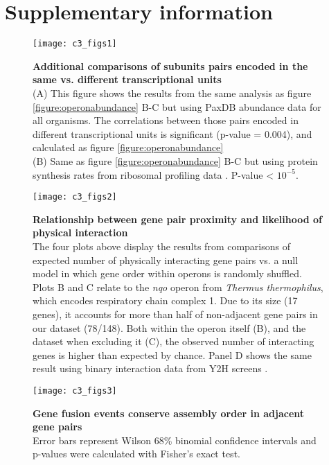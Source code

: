 \documentclass[a4paper,11pt,twoside,openright]{scrbook}
\begin{document}
\section{Supplementary information}
\vspace{40mm}
\begin{figure}[hb]
    \texttt{[image: c3\_figs1]}
    \caption[Additional comparisons of subunits pairs encoded in the same vs. different transcriptional units]{\sffamily \textbf{Additional comparisons of subunits pairs encoded in the same vs. different transcriptional units} \\ \small (A) This figure shows the results from the same analysis as figure \ref{figure:operonabundance} B-C but using PaxDB abundance data for all organisms. The correlations between those pairs encoded in different transcriptional units is significant (p-value = 0.004), and calculated as figure \ref{figure:operonabundance}\\
    (B) Same as figure \ref{figure:operonabundance} B-C but using protein synthesis rates from ribosomal profiling data \cite{Li2014b}. P-value < \(10^{-5}\).}
    \label{c3fs1}
\end{figure}

\begin{figure}
    \texttt{[image: c3\_figs2]}
    \caption[Relationship between gene pair proximity and likelihood of physical interaction]{\sffamily \textbf{Relationship between gene pair proximity and likelihood of physical interaction} \\ \small The four plots above display the results from comparisons of expected number of physically interacting gene pairs vs. a null model in which gene order within operons is randomly shuffled. Plots B and C relate to the \textit{nqo} operon from \textit{Thermus thermophilus}, which encodes respiratory chain complex 1. Due to its size (17 genes), it accounts for more than half of non-adjacent gene pairs in our dataset (78/148). Both within the operon itself (B), and the dataset when excluding it (C), the observed number of interacting genes is higher than expected by chance. Panel D shows the same result using binary interaction data from Y2H screens \cite{Rajagopala2014}.}
    \label{c3fs2}
\end{figure}

\begin{figure}
    \texttt{[image: c3\_figs3]}
    \caption[Gene fusion events conserve assembly order in adjacent gene pairs]{\sffamily \textbf{Gene fusion events conserve assembly order in adjacent gene pairs} \\ \small Error bars represent Wilson 68\% binomial confidence intervals and p-values were calculated with Fisher's exact test.}
    \label{c3fs3}
\end{figure}
\end{document}

